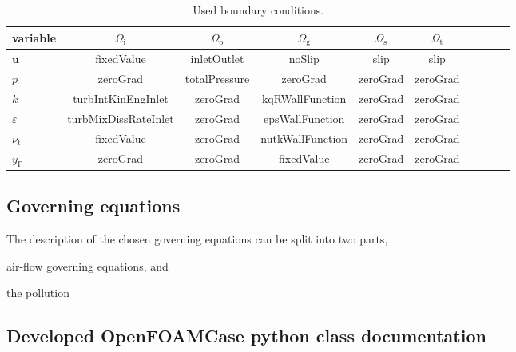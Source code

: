 \begin{table}[htbp]
    \caption{Used boundary conditions.}
    \label{tab:bc}
    \centering
    {
    \begin{tabular}{lccccccccc}
        \hline
        variable & $\Omega_{\mathrm{i}}$ & $\Omega_{\mathrm{o}}$ & $\Omega_{\mathrm{g}}$ &  $\Omega_{\mathrm{s}}$ & $\Omega_{\mathrm{t}}$ \\
        \hline
        $\bm{u}$ & fixedValue & inletOutlet & noSlip & slip & slip\\
        $p$ & zeroGrad & totalPressure & zeroGrad & zeroGrad & zeroGrad\\
        $k$ & turbIntKinEngInlet & zeroGrad & kqRWallFunction & zeroGrad & zeroGrad\\
        $\varepsilon$ & turbMixDissRateInlet & zeroGrad & epsWallFunction & zeroGrad & zeroGrad\\
        $\nu_{\mathrm{t}}$ & fixedValue & zeroGrad & nutkWallFunction & zeroGrad & zeroGrad\\
        $y_{\mathrm{P}}$ & zeroGrad & zeroGrad & fixedValue & zeroGrad & zeroGrad\\
        \hline
    \end{tabular}
    }
\end{table}

\subsection{Governing equations}
\label{subsec:govEq}
The description of the chosen governing equations can be split into two parts, 
\begin{inparaenum}[(i)]
    \item air-flow governing equations, and
    \item the pollution 
\end{inparaenum}

\subsection{Developed OpenFOAMCase python class documentation}
\label{subsec:ofCaseClass}
